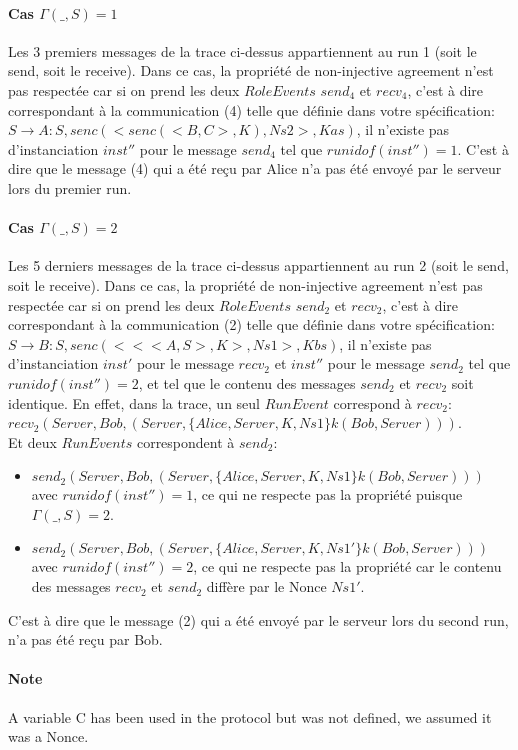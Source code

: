 \documentclass[10pt,a4paper]{article}
\begin{document}
\paragraph{Cas $\Gamma(\_, S) = 1$}
Les 3 premiers messages de la trace ci-dessus appartiennent au run 1 (soit le send, soit le receive).
Dans ce cas, la propriété de non-injective agreement n'est pas respectée car si on prend les deux $RoleEvents$ $send_4$ et $recv_4$, c'est à dire correspondant à la communication (4) telle que définie dans votre spécification: $S \rightarrow A : S , senc ( < senc ( < B , C > , K ) , Ns2 > , Kas )$, il n'existe pas d'instanciation $inst''$ pour le message $send_4$ tel que $runidof(inst'') = 1$.
C'est à dire que le message (4) qui a été reçu par Alice n'a pas été envoyé par le serveur lors du premier run.

\paragraph{Cas $\Gamma(\_, S) = 2$}
Les 5 derniers messages de la trace ci-dessus appartiennent au run 2 (soit le send, soit le receive).
Dans ce cas, la propriété de non-injective agreement n'est pas respectée car si on prend les deux $RoleEvents$ $send_2$ et $recv_2$, c'est à dire correspondant à la communication (2) telle que définie dans votre spécification: $S \rightarrow B : S , senc ( < < < A , S > , K > , Ns1 > , Kbs ) $, il n'existe pas d'instanciation $inst'$ pour le message $recv_2$ et $inst''$ pour le message $send_2$ tel que $runidof(inst'') = 2$, et tel que le contenu des messages $send_2$ et  $recv_2$ soit identique.
En effet, dans la trace, un seul $RunEvent$ correspond à $recv_2$: $recv_2(Server, Bob, (Server,\{Alice,Server,K,Ns1\}k(Bob,Server)))$.\\
Et deux $RunEvents$ correspondent à $send_2$:
\begin{itemize}
\item $send_2(Server, Bob, (Server,\{Alice,Server,K,Ns1\}k(Bob,Server)))$ avec $runidof(inst'') = 1$, ce qui ne respecte pas la propriété puisque $\Gamma(\_, S) = 2$.
\item $send_2(Server, Bob, (Server,\{Alice,Server,K,Ns1'\}k(Bob,Server)))$ avec $runidof(inst'') = 2$, ce qui ne respecte pas la propriété car le contenu des messages $recv_2$ et $send_2$ diffère par le Nonce $Ns1'$.
\end{itemize}

C'est à dire que le message (2) qui a été envoyé par le serveur lors du second run, n'a pas été reçu par Bob.

\paragraph{Note}
A variable C has been used in the protocol but was not defined, we assumed it was a Nonce.
\end{document}
